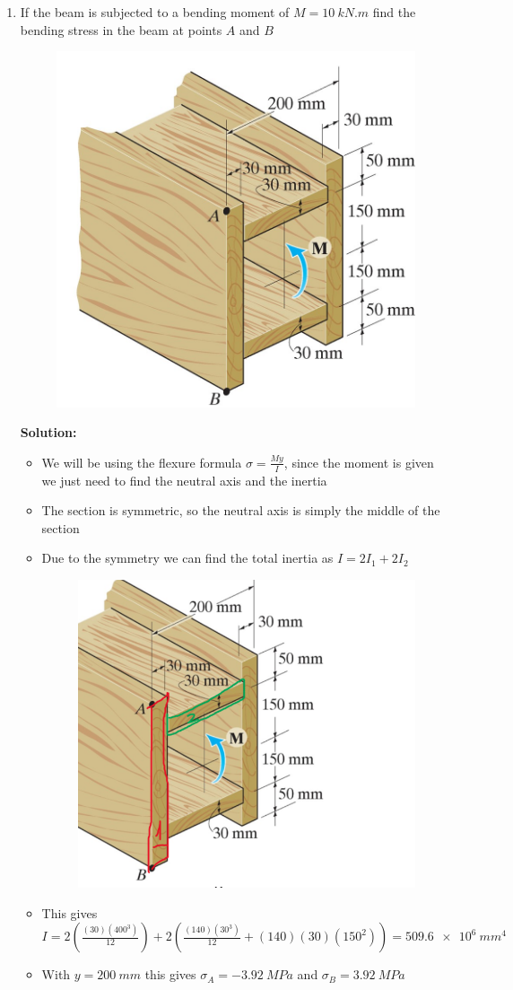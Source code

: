 \documentclass[12pt, oneside]{article}
\begin{document}
\begin{enumerate}
	\item %
		If the beam is subjected to a bending moment of $M=\SI{10}{kN.m}$ find the bending stress in the beam at points $A$ and $B$
		\begin{figure}[H]
			\centering
			\includegraphics[width=0.5\linewidth]{f6-12}
		\end{figure}
			\textbf{Solution:}
			\begin{itemize}
				\item We will be using the flexure formula $\sigma = \frac{My}{I}$, since the moment is given we just need to find the neutral axis and the inertia
				\item The section is symmetric, so the neutral axis is simply the middle of the section
				\item Due to the symmetry we can find the total inertia as $I = 2I_1 + 2I_2$
					\begin{figure}[H]
						\centering
						\includegraphics[width=0.4\linewidth]{5-4}
					\end{figure}
				\item This gives $I = 2\left( \frac{(30)(400^3)}{12} \right) + 2\left( \frac{(140)(30^3)}{12} + (140)(30)(150^2) \right) = 	\SI{509.6e6}{mm^4} $
				\item With $y = 	\SI{200}{mm} $ this gives $\sigma_A = 	\SI{-3.92}{MPa} $ and $\sigma_B = 	\SI{3.92}{MPa} $
			\end{itemize}


\end{enumerate}
\end{document}
